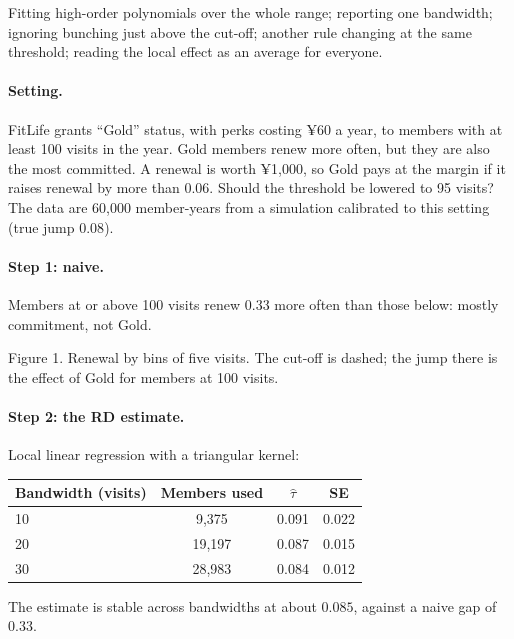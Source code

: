 \documentclass[11pt]{article}
\begin{document}
\begin{pitfall}[RD errors]
Fitting high-order polynomials over the whole range; reporting one bandwidth; ignoring bunching just above the cut-off; another rule changing at the
same threshold; reading the local effect as an average for everyone.
\end{pitfall}


\sectiontwo

\paragraph{Setting.} FitLife grants ``Gold'' status, with perks costing ¥60 a year, to members with at least 100 visits in the year. Gold members renew
more often, but they are also the most committed. A renewal is worth ¥1{,}000, so Gold pays at the margin if it raises renewal by more than $0.06$.
Should the threshold be lowered to 95 visits? The data are 60{,}000 member-years from a simulation calibrated to this setting
(true jump $0.08$).

\paragraph{Step 1: naive.} Members at or above 100 visits renew $0.33$ more often than those below: mostly commitment, not Gold.

\begin{center}

\small Figure 1. Renewal by bins of five visits. The cut-off is dashed; the jump there is the effect of Gold for members at 100 visits.
\end{center}

\paragraph{Step 2: the RD estimate.} Local linear regression with a triangular kernel:
\begin{center}
\begin{tabular}{lccc}
\toprule
Bandwidth (visits) & Members used & $\hat\tau$ & SE \\
\midrule
10 & 9{,}375 & 0.091 & 0.022 \\
20 & 19{,}197 & 0.087 & 0.015 \\
30 & 28{,}983 & 0.084 & 0.012 \\
\bottomrule
\end{tabular}
\end{center}
The estimate is stable across bandwidths at about $0.085$, against a naive gap of $0.33$.
\end{document}
